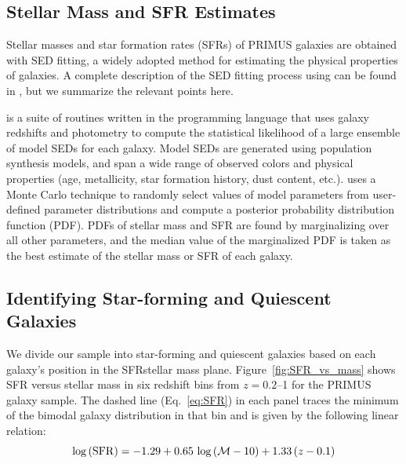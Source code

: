 \subsection{Stellar Mass and SFR Estimates}\label{sec:SFR}
 
Stellar masses and star formation rates (SFRs) of PRIMUS galaxies are obtained with SED fitting, a widely adopted method for estimating the physical properties of galaxies.
A complete description of the SED fitting process using \iSEDfit can be found in \citet{Moustakas13}, but we summarize the relevant points here.

\iSEDfit is a suite of routines written in the \IDL programming language that uses galaxy redshifts and photometry to compute the statistical likelihood of a large ensemble of model SEDs for each galaxy.
Model SEDs are generated using population synthesis models, and span a wide range of observed colors and physical properties (age, metallicity, star formation history, dust content, etc.).
\iSEDfit uses a Monte Carlo technique to randomly select values of model parameters from user-defined parameter distributions and compute a posterior probability distribution function (PDF).
PDFs of stellar mass and SFR are found by marginalizing over all other parameters, and the median value of the marginalized PDF is taken as the best estimate of the stellar mass or SFR of each galaxy.

\subsection{Identifying Star-forming and Quiescent Galaxies}\label{sec:SFQ}

We divide our sample into star-forming and quiescent galaxies based on each galaxy's position in the SFR\textendash stellar mass plane. 
Figure~\ref{fig:SFR_vs_mass} shows SFR versus stellar mass in six redshift bins from ${z=0.2}$--1 for the PRIMUS galaxy sample.
The dashed line (Eq.~\ref{eq:SFR}) in each panel traces the minimum of the bimodal galaxy distribution in that bin and is given by the following linear relation:
\begin{equation}
\log\,({\rm SFR}) = -1.29 + 0.65\,\log\,(\mass - 10) + 1.33\,(z - 0.1)
\label{eq:SFR}
\end{equation}

